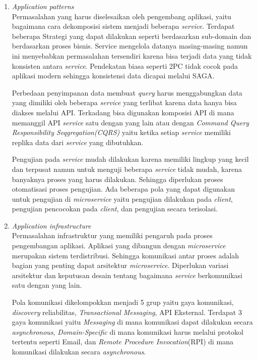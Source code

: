 \begin{enumerate}[leftmargin=1.3cm]
	\item \textit{Application patterns}\\
	Permasalahan yang harus diselesaikan oleh pengembang aplikasi, yaitu bagaimana cara dekomposisi sistem menjadi beberapa \textit{service}. Terdapat beberapa Strategi yang dapat dilakukan seperti berdasarkan sub-domain dan berdasarkan proses bisnis. Service mengelola datanya masing-masing namun ini menyebabkan permasalahan tersendiri karena bisa terjadi data yang tidak konsisten antara \textit{service}. Pendekatan biasa seperti 2PC tidak cocok pada aplikasi modern sehingga konsistensi data dicapai melalui SAGA.
	
	Perbedaan penyimpanan data membuat \textit{query} harus menggabungkan data yang dimiliki oleh beberapa \textit{service} yang terlibat karena data hanya bisa diakses melalui API. Terkadang bisa digunakan komposisi API di mana memanggil API \textit{service} satu dengan yang lain atau dengan \textit{Command Query Responsibility Seqgregation(CQRS)} yaitu ketika setiap \textit{service} memiliki replika data dari \textit{service} yang dibutuhkan.

	Pengujian pada \textit{service} mudah dilakukan karena memiliki lingkup yang kecil dan terpusat namun untuk menguji beberapa \textit{service} tidak mudah, karena banyaknya proses yang harus dilakukan. Sehingga diperlukan proses otomatisasi proses pengujian. Ada beberapa pola yang dapat digunakan untuk pengujian di \textit{microservice} yaitu pengujian dilakukan pada \textit{client}, pengujian pencocokan pada \textit{client}, dan pengujian secara terisolasi.  

	\item \textit{Application infrastructure} \\
	Permasalahan infrastruktur yang memiliki pengaruh pada proses pengembangan aplikasi. Aplikasi yang dibangun dengan \textit{microservice} merupakan sistem terdistribusi. Sehingga komunikasi antar proses adalah bagian yang penting dapat arsitektur \textit{microservice}. Diperlukan variasi arsitektur dan keputusan desain tentang bagaimana \textit{service} berkomunikasi satu dengan yang lain. 

	Pola komunikasi dikelompokkan menjadi 5 grup yaitu gaya komunikasi, \textit{discovery} reliabilitas, \textit{Transactional Messaging}, API Eksternal. Terdapat 3 gaya komunikasi yaitu \textit{Messaging} di mana komunikasi dapat dilakukan secara \textit{asynchronous}, \textit{Domain-Specific} di mana komunikasi harus melalui protokol tertentu seperti Email, dan \textit{Remote Procedure Invocation}(RPI) di mana komunikasi dilakukan secara \textit{asynchronous}.
	

\end{enumerate}
